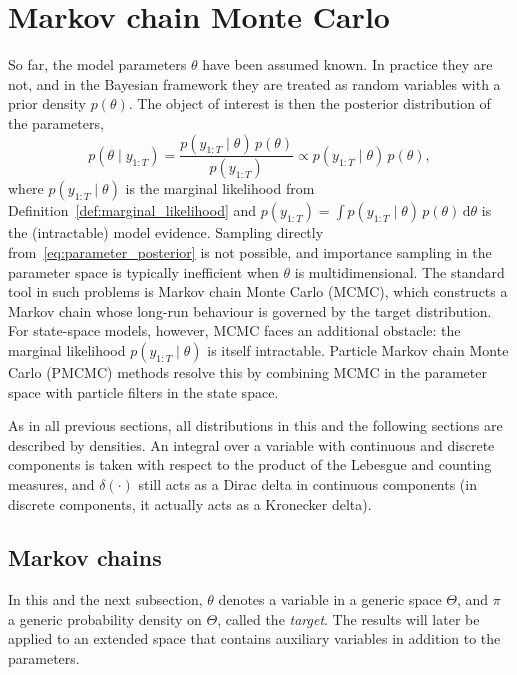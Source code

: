 \section{Markov chain Monte Carlo}
\label{sec:mcmc}
So far, the model parameters $\theta$ have been assumed known. In practice they are not, and in the Bayesian framework they are treated as random variables with a prior density $p(\theta)$. The object of interest is then the posterior distribution of the parameters,
\begin{equation}
    p(\theta\mid y_{1:T}) = \frac{p(y_{1:T}\mid\theta)\,p(\theta)}{p(y_{1:T})} \propto p(y_{1:T}\mid\theta)\,p(\theta),
    \label{eq:parameter_posterior}
\end{equation}
where $p(y_{1:T}\mid\theta)$ is the marginal likelihood from Definition~\ref{def:marginal_likelihood} and $p(y_{1:T}) = \int p(y_{1:T}\mid\theta)\,p(\theta)\,\mathrm{d}\theta$ is the (intractable) model evidence.
Sampling directly from~\eqref{eq:parameter_posterior} is not possible, and importance sampling in the parameter space is typically inefficient when $\theta$ is multidimensional.
The standard tool in such problems is Markov chain Monte Carlo (MCMC), which constructs a Markov chain whose long-run behaviour is governed by the target distribution.
For state-space models, however, MCMC faces an additional obstacle: the marginal likelihood $p(y_{1:T}\mid\theta)$ is itself intractable.
Particle Markov chain Monte Carlo (PMCMC) methods \cite{andrieu2010particle} resolve this by combining MCMC in the parameter space with particle filters in the state space.

As in all previous sections, all distributions in this and the following sections are described by densities. An integral over a variable with continuous and discrete components is taken with respect to the product of the Lebesgue and counting measures, and $\delta(\cdot)$ still acts as a Dirac delta in continuous components (in discrete components, it actually acts as a Kronecker delta).

\subsection{Markov chains}
\label{sec:markov_chains}
In this and the next subsection, $\theta$ denotes a variable in a generic space $\Theta$, and $\pi$ a generic probability density on $\Theta$, called the \emph{target}. The results will later be applied to an extended space that contains auxiliary variables in addition to the parameters.


